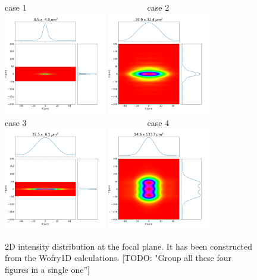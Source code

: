 \documentclass{iucr}              %
\newcommand{\todo}[1]{{\color{red}[TODO: "#1'']}}
\begin{document}
\newpage

\begin{figure}\label{fig:2DWofry1D}
    \centering
    case 1~~~~~~~~~~~~~~~~~~~~~~~~~~~~~case 2\\
    \includegraphics[width=0.4\textwidth]{figures/case1_wofry_ws_results.png}
    \includegraphics[width=0.4\textwidth]{figures/case2_wofry_ws_results.png}\\
    case 3~~~~~~~~~~~~~~~~~~~~~~~~~~~~~case 4\\
    \includegraphics[width=0.4\textwidth]{figures/case3_wofry_ws_results.png}
    \includegraphics[width=0.4\textwidth]{figures/case4_wofry_ws_results.png}
    \caption{2D intensity distribution at the focal plane. It has been constructed from the Wofry1D calculations.
    \todo{Group all these four figures in a single one}
    }
\end{figure}
\end{document}
